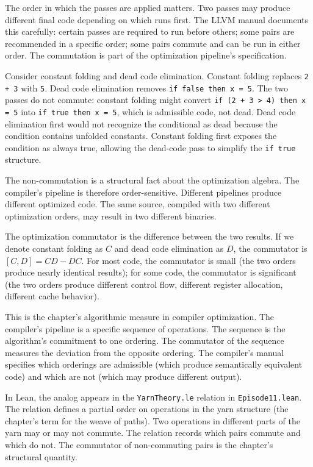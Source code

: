 The order in which the passes are applied matters. Two passes may
produce different final code depending on which runs first. The
LLVM manual documents this carefully: certain passes are required
to run before others; some pairs are recommended in a specific
order; some pairs commute and can be run in either order. The
commutation is part of the optimization pipeline's specification.

Consider constant folding and dead code elimination. Constant
folding replaces \texttt{2 + 3} with \texttt{5}. Dead code
elimination removes \texttt{if false then x = 5}. The two passes
do not commute: constant folding might convert \texttt{if (2 +
3 > 4) then x = 5} into \texttt{if true then x = 5}, which is
admissible code, not dead. Dead code elimination first would not
recognize the conditional as dead because the condition contains
unfolded constants. Constant folding first exposes the
condition as always true, allowing the dead-code pass to simplify
the \texttt{if true} structure.

The non-commutation is a structural fact about the optimization
algebra. The compiler's pipeline is therefore order-sensitive.
Different pipelines produce different optimized code. The same
source, compiled with two different optimization orders, may
result in two different binaries.

The optimization commutator is the difference between the two
results. If we denote constant folding as $C$ and dead code
elimination as $D$, the commutator is $[C, D] = CD - DC$. For
most code, the commutator is small (the two orders produce
nearly identical results); for some code, the commutator is
significant (the two orders produce different control flow,
different register allocation, different cache behavior).

This is the chapter's algorithmic measure in compiler optimization.
The compiler's pipeline is a specific sequence of operations. The
sequence is the algorithm's commitment to one ordering. The
commutator of the sequence measures the deviation from the
opposite ordering. The compiler's manual specifies which orderings
are admissible (which produce semantically equivalent code) and
which are not (which may produce different output).

In Lean, the analog appears in the \texttt{YarnTheory.le} relation
in \texttt{Episode11.lean}. The relation defines a partial order
on operations in the yarn structure (the chapter's term for the
weave of paths). Two operations in different parts of the yarn may
or may not commute. The relation records which pairs commute and
which do not. The commutator of non-commuting pairs is the
chapter's structural quantity.

